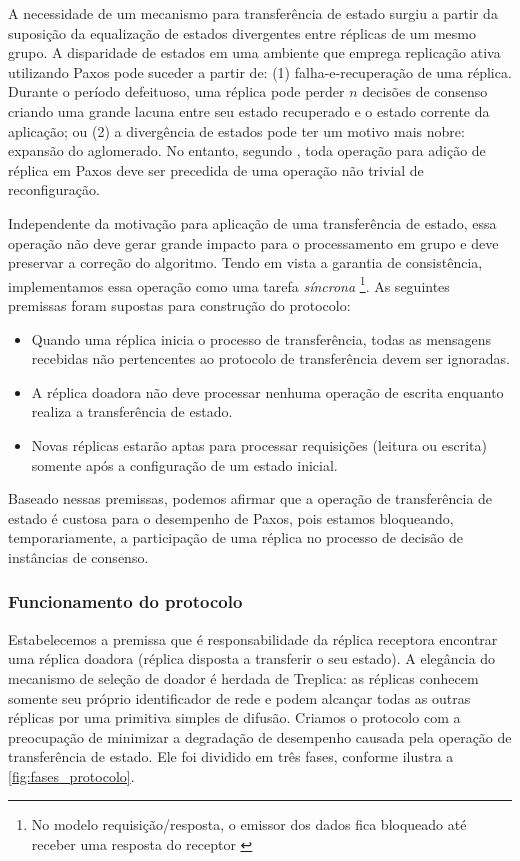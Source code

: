 A necessidade de um mecanismo para transferência de estado surgiu a partir da suposição da
equalização de estados divergentes entre réplicas de um mesmo grupo. A disparidade de
estados em uma ambiente que emprega replicação ativa utilizando Paxos pode suceder a
partir de: (1) falha-e-recuperação de uma réplica. Durante o período defeituoso, uma
réplica pode perder $n$ decisões de consenso criando uma grande lacuna entre seu estado
recuperado e o estado corrente da aplicação; ou (2) a divergência de estados pode ter um
motivo mais nobre: expansão do aglomerado. No entanto, segundo ,
toda operação para adição de réplica em Paxos deve ser precedida de uma operação não
trivial de reconfiguração.

Independente da motivação para aplicação de uma transferência de estado, essa operação
não deve gerar grande impacto para o processamento em grupo e deve preservar a correção do
algoritmo. Tendo em vista a garantia de consistência, implementamos essa operação como uma
tarefa \emph{síncrona} \footnote{No modelo requisição/resposta, o emissor dos dados fica
bloqueado até receber uma resposta do receptor \cite{coulouris11}}. As seguintes premissas
foram supostas para construção do protocolo:

\begin{itemize}
  \item Quando uma réplica inicia o processo de transferência, todas as mensagens
    recebidas não pertencentes ao protocolo de transferência devem ser ignoradas.
  \item A réplica doadora não deve processar nenhuma operação de escrita enquanto realiza
    a transferência de estado.
  \item Novas réplicas estarão aptas para processar requisições (leitura ou escrita)
    somente após a configuração de um estado inicial.
\end{itemize}

Baseado nessas premissas, podemos afirmar que a operação de transferência de estado é
custosa para o desempenho de Paxos, pois estamos bloqueando, temporariamente, a
participação de uma réplica no processo de decisão de instâncias de consenso.

\subsubsection{Funcionamento do protocolo}

Estabelecemos a premissa que é responsabilidade da réplica receptora encontrar uma réplica
doadora (réplica disposta a transferir o seu estado). A elegância do mecanismo de seleção
de doador é herdada de Treplica: as réplicas conhecem somente seu próprio identificador de
rede e podem alcançar todas as outras réplicas por uma primitiva simples de difusão.
Criamos o protocolo com a preocupação de minimizar a degradação de desempenho causada pela
operação de transferência de estado. Ele foi dividido em três fases, conforme ilustra a
\autoref{fig:fases_protocolo}.

